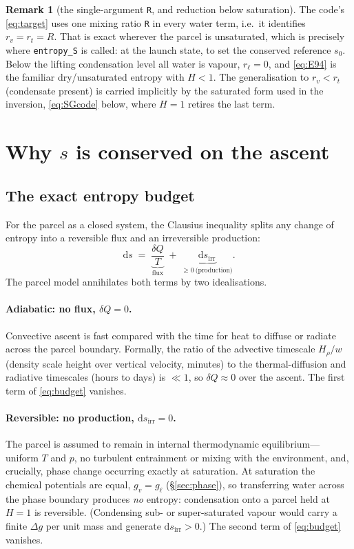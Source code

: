 \documentclass[11pt,a4paper]{article}
\theoremstyle{definition}
\newtheorem{remark}{Remark}
\newcommand{\rt}{r_t}
\newcommand{\rvv}{r_v}
\newcommand{\rl}{r_\ell}
\newcommand{\dd}{\mathrm{d}}
\begin{document}
\begin{remark}[the single-argument \texttt{R}, and reduction below saturation]
The code's \eqref{eq:target} uses one mixing ratio \texttt{R} in every water
term, i.e.\ it identifies $\rvv=\rt=R$. That is exact wherever the parcel is
unsaturated, which is precisely where \texttt{entropy\_S} is called: at the
launch state, to set the conserved reference $s_0$. Below the lifting
condensation level all water is vapour, $\rl=0$, and \eqref{eq:E94} is the
familiar dry/unsaturated entropy with $H<1$. The generalisation to $\rvv<\rt$
(condensate present) is carried implicitly by the saturated form used in the
inversion, \eqref{eq:SGcode} below, where $H=1$ retires the last term.
\end{remark}

\section{Why \texorpdfstring{$s$}{s} is conserved on the ascent}
\label{sec:conservation}

\subsection{The exact entropy budget}

For the parcel as a closed system, the Clausius inequality splits any change of
entropy into a reversible flux and an irreversible production:
\begin{equation}\label{eq:budget}
\dd s \;=\; \underbrace{\frac{\delta Q}{T}}_{\text{flux}}
        \;+\; \underbrace{\dd s_{\mathrm{irr}}}_{\ge 0\ \text{(production)}} .
\end{equation}
The parcel model annihilates both terms by two idealisations.

\paragraph{Adiabatic: no flux, $\delta Q=0$.} Convective ascent is fast
compared with the time for heat to diffuse or radiate across the parcel
boundary. Formally, the ratio of the advective timescale $H_\rho/w$ (density
scale height over vertical velocity, minutes) to the thermal-diffusion and
radiative timescales (hours to days) is $\ll1$, so $\delta Q\approx0$ over the
ascent. The first term of \eqref{eq:budget} vanishes.

\paragraph{Reversible: no production, $\dd s_{\mathrm{irr}}=0$.} The parcel is
assumed to remain in internal thermodynamic equilibrium---uniform $T$ and $p$,
no turbulent entrainment or mixing with the environment, and, crucially, phase
change occurring exactly at saturation. At saturation the chemical potentials
are equal, $g_v=g_\ell$ (\S\ref{sec:phase}), so transferring water across the
phase boundary produces \emph{no} entropy: condensation onto a parcel held at
$H=1$ is reversible. (Condensing sub- or super-saturated vapour would carry a
finite $\Delta g$ per unit mass and generate $\dd s_{\mathrm{irr}}>0$.) The
second term of \eqref{eq:budget} vanishes.
\end{document}
